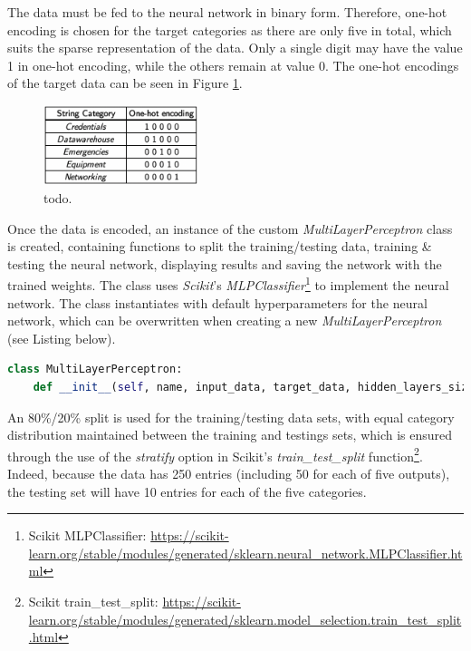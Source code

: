 \documentclass[letterpaper,12pt]{article}
\begin{document}
The data must be fed to the neural network in binary form. Therefore, one-hot encoding is chosen for the target categories as there are only five in total, which suits the sparse representation of the data. Only a single digit may have the value 1 in one-hot encoding, while the others remain at value 0. The one-hot encodings of the target data can be seen in Figure \ref{fig:one_hot_encoding}.

\begin{figure}[h] 
\centerline{\includegraphics[width=0.4\textwidth]{report/figures/one_hot_encoding.png}}
\caption{\label{fig:one_hot_encoding}todo.}
\end{figure}

Once the data is encoded, an instance of the custom \textit{MultiLayerPerceptron} class is created, containing functions to split the training/testing data, training \& testing the neural network, displaying results and saving the network with the trained weights. The class uses \textit{Scikit}'s \textit{MLPClassifier}\footnote{Scikit MLPClassifier: \url{https://scikit-learn.org/stable/modules/generated/sklearn.neural_network.MLPClassifier.html}} to implement the neural network. The class instantiates with default hyperparameters for the neural network, which can be overwritten when creating a new \textit{MultiLayerPerceptron} (see Listing below).

\begin{lstlisting}[language=Python]
class MultiLayerPerceptron:
    def __init__(self, name, input_data, target_data, hidden_layers_size=(15,), solver="adam", activation_function="logistic", learning_rate_init=0.6, momentum=0.9, optimisation_tolerance=0.0001, num_iterations_no_change=1000, max_iterations=10000, verbose=config.debug):
\end{lstlisting}

An 80\%/20\% split is used for the training/testing data sets, with equal category distribution maintained between the training and testings sets, which is ensured through the use of the \textit{stratify} option in Scikit's \textit{train\_test\_split} function\footnote{Scikit train\_test\_split: \url{https://scikit-learn.org/stable/modules/generated/sklearn.model_selection.train_test_split.html}}. Indeed, because the data has 250 entries (including 50 for each of five outputs), the testing set will have 10 entries for each of the five categories.\\
\end{document}
